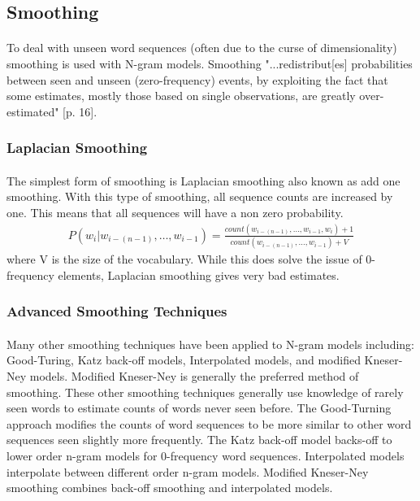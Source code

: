 \subsection{Smoothing}
\paragraph{}
To deal with unseen word sequences (often due to the curse of dimensionality) smoothing is used with N-gram models. Smoothing "...redistribut[es] probabilities between seen and unseen (zero-frequency) events, by
exploiting the fact that some estimates, mostly those based on single observations, are greatly over-estimated" \cite{Mikolav2012}[p. 16].
\subsubsection{Laplacian Smoothing}
\paragraph{}
The simplest form of smoothing is Laplacian smoothing also known as add one smoothing. With this type of smoothing, all sequence counts are increased by one. This means that all sequences will have a non zero probability. 
\begin{align}
P(w_i | w_{i-(n-1)},\dots, w_{i-1}) = \frac{count(w_{i-(n-1)},\dots,w_{i-1},w_i)+1}{count(w_{i-(n-1)},\dots,w_{i-1})+V}
\end{align}
where V is the size of the vocabulary. While this does solve the issue of 0-frequency elements, Laplacian smoothing gives very bad estimates. 
\subsubsection{Advanced Smoothing Techniques}
\paragraph{}
Many other smoothing techniques have been applied to N-gram models including: Good-Turing, Katz back-off models, Interpolated models, and modified Kneser-Ney models. Modified Kneser-Ney is generally the preferred method of smoothing. These other smoothing techniques generally use knowledge of rarely seen words to estimate counts of words never seen before. The Good-Turning approach modifies the counts of word sequences to be more similar to other word sequences seen slightly more frequently. The Katz back-off model backs-off to lower order n-gram models for 0-frequency word sequences. Interpolated models interpolate between different order n-gram models. Modified Kneser-Ney smoothing combines back-off smoothing and interpolated models.

